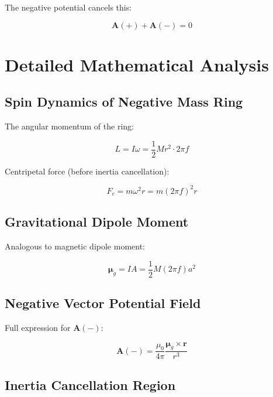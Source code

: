\documentclass{article}
\begin{document}
The negative potential cancels this:

\begin{equation}
    \mathbf{A}(+) + \mathbf{A}(-) = 0
\end{equation}

\section{Detailed Mathematical Analysis}

\subsection{Spin Dynamics of Negative Mass Ring}

The angular momentum of the ring:

\begin{equation}
    L = I\omega = \frac{1}{2}Mr^2 \cdot 2\pi f
\end{equation}

Centripetal force (before inertia cancellation):

\begin{equation}
    F_c = m\omega^2 r = m(2\pi f)^2 r
\end{equation}

\subsection{Gravitational Dipole Moment}

Analogous to magnetic dipole moment:

\begin{equation}
    \mathbf{\mu}_g = IA = \frac{1}{2}M(2\pi f)a^2
\end{equation}

\subsection{Negative Vector Potential Field}

Full expression for $\mathbf{A}(-)$:

\begin{equation}
    \mathbf{A}(-) = \frac{\mu_0}{4\pi} \frac{\mathbf{\mu}_g \times \mathbf{r}}{r^3}
\end{equation}

\subsection{Inertia Cancellation Region}
\end{document}

